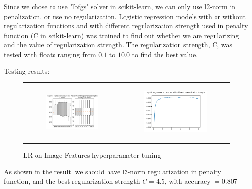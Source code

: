 \documentclass[11.5pt]{article}
\begin{document}
\begin{enumerate}
\begin{itemize}
\begin{enumerate}
                Since we chose to use "lbfgs" solver in scikit-learn, we can only use l2-norm in penalization, or use no regularization.
                Logistic regression models with or without regularization functions and with different regularization strength used in penalty function (C in scikit-learn) was trained to find out whether we are regularizing and the value of regularization strength.
                The regularization strength, C, was tested with floats ranging from $0.1$ to $10.0$ to find the best value.

                Testing results:

                \begin{figure}[h!]
                    \centering
                    \begin{tabular}[c]{cc}
                        \begin{subfigure}[h]{0.4\linewidth}
                            \centering
                            \includegraphics[width=0.75\linewidth]{images/log_reg_hyperparam_penalty.png}
                        \end{subfigure} &
                        \begin{subfigure}[h]{0.4\linewidth}
                            \centering
                            \includegraphics[width=0.75\linewidth]{images/log_reg_hyperparam_c.png}
                        \end{subfigure}
                    \end{tabular}
                    \caption{LR on Image Features hyperparameter tuning}
                \end{figure}
                As shown in the result, we should have l2-norm regularization in penalty function, and the best regularization strength $C= 4.5$, with accuracy $= 0.807$


\end{enumerate}
\end{itemize}
\end{enumerate}
\end{document}
